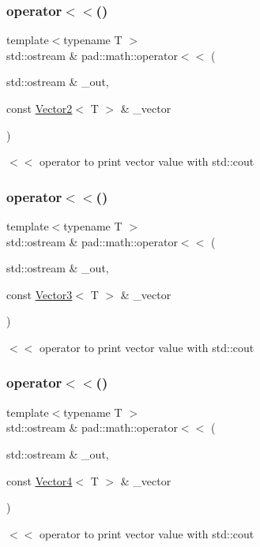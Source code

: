 \subsubsection{\texorpdfstring{operator$<$$<$()}{operator<<()}\hspace{0.1cm}{\footnotesize\ttfamily [1/3]}}
{\footnotesize\ttfamily template$<$typename T $>$ \\
std\+::ostream \& pad\+::math\+::operator$<$$<$ (\begin{DoxyParamCaption}\item[{std\+::ostream \&}]{\+\_\+out,  }\item[{const \mbox{\hyperlink{structpad_1_1math_1_1_vector2}{Vector2}}$<$ T $>$ \&}]{\+\_\+vector }\end{DoxyParamCaption})}

$<$$<$ operator to print vector value with std\+::cout \mbox{\label{namespacepad_1_1math_a9e468612d54c187ec0eaac48e304e673}} 
\subsubsection{\texorpdfstring{operator$<$$<$()}{operator<<()}\hspace{0.1cm}{\footnotesize\ttfamily [2/3]}}
{\footnotesize\ttfamily template$<$typename T $>$ \\
std\+::ostream \& pad\+::math\+::operator$<$$<$ (\begin{DoxyParamCaption}\item[{std\+::ostream \&}]{\+\_\+out,  }\item[{const \mbox{\hyperlink{structpad_1_1math_1_1_vector3}{Vector3}}$<$ T $>$ \&}]{\+\_\+vector }\end{DoxyParamCaption})}

$<$$<$ operator to print vector value with std\+::cout \mbox{\label{namespacepad_1_1math_aea739f95f7147095cec34ccedee7eea2}} 
\subsubsection{\texorpdfstring{operator$<$$<$()}{operator<<()}\hspace{0.1cm}{\footnotesize\ttfamily [3/3]}}
{\footnotesize\ttfamily template$<$typename T $>$ \\
std\+::ostream \& pad\+::math\+::operator$<$$<$ (\begin{DoxyParamCaption}\item[{std\+::ostream \&}]{\+\_\+out,  }\item[{const \mbox{\hyperlink{structpad_1_1math_1_1_vector4}{Vector4}}$<$ T $>$ \&}]{\+\_\+vector }\end{DoxyParamCaption})}

$<$$<$ operator to print vector value with std\+::cout 